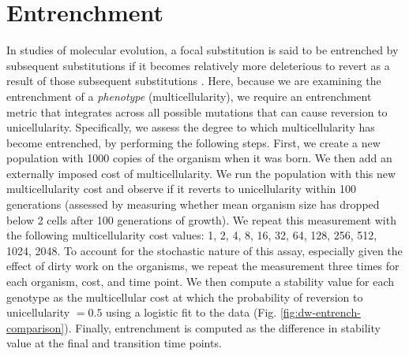 \documentclass[
]{book}
\begin{document}
\hypertarget{entrenchment}{%
\chapter{Entrenchment}\label{entrenchment}}

In studies of molecular evolution, a focal substitution is said to be entrenched by subsequent substitutions if it becomes relatively more deleterious to revert as a result of those subsequent substitutions \citep{shah2015contingency, flynn2017inference, starr2018pervasive, biswas2019epistasis}. Here, because we are examining the entrenchment of a \textit{phenotype} (multicellularity), we require an entrenchment metric that integrates across all possible mutations that can cause reversion to unicellularity. Specifically, we assess the degree to which multicellularity has become entrenched, by performing the following steps. First, we create a new population with 1000 copies of the organism when it was born. We then add an externally imposed cost of multicellularity. We run the population with this new multicellularity cost and observe if it reverts to unicellularity within 100 generations (assessed by measuring whether mean organism size has dropped below 2 cells after 100 generations of growth). We repeat this measurement with the following multicellularity cost values: 1, 2, 4, 8, 16, 32, 64, 128, 256, 512, 1024, 2048. To account for the stochastic nature of this assay, especially given the effect of dirty work on the organisms, we repeat the measurement three times for each organism, cost, and time point. We then compute a stability value for each genotype as the multicellular cost at which the probability of reversion to unicellularity \(= 0.5\) using a logistic fit to the data (Fig. \ref{fig:dw-entrench-comparison}). Finally, entrenchment is computed as the difference in stability value at the final and transition time points.
\end{document}
